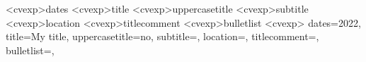 \newcommand{\datesstyle}[1]{
    \fontsize{\datefontsize}{0}\textnormal{#1}
}

\newcommand{\titlestyle}[1]{
    \fontsize{\datefontsize}{0}\textcolor{hltxt}{\textbf{#1}}
}

\newcommand{\subtitlestyle}[1]{
    \ifthenelse{\equal{#1}{}}
    {
        \vspace{-\baselineskip}
    }{\textcolor{subhltxt}{\textbf{#1}}}
}

\newcommand{\locationstyle}[1]{
    \ifthenelse{\equal{#1}{}}
    {}{\textnormal{#1}}
}

\newcommand{\titlecommentstyle}[1]{
    \ifthenelse{\equal{#1}{}}
    {
        \vspace{-\baselineskip}
    }{(#1)}
}

\newcommand{\bulletliststyle}[1]{
    \ifthenelse{\equal{#1}{}}{}{
        \vspace{\vspacebulletvalue}
        \readlist\mylist{#1}%
        \begin{itemize} 
            \foreachitem\z\in\mylist[]{
                \item \z
            }
        \end{itemize}
        \bulletpadding
    }
}



\DeclareOptionX<cvexp>{dates}{\def\dates{#1}}
\DeclareOptionX<cvexp>{title}{\def\title{#1}}
\DeclareOptionX<cvexp>{uppercasetitle}{\def\uppercasetitle{#1}}
\DeclareOptionX<cvexp>{subtitle}{\def\subtitle{#1}}
\DeclareOptionX<cvexp>{location}{\def\location{#1}}
\DeclareOptionX<cvexp>{titlecomment}{\def\titlecomment{#1}}
\DeclareOptionX<cvexp>{bulletlist}{\def\bulletlist{#1}}
\ExecuteOptionsX<cvexp>{
    dates=2022,
    title=My title,
    uppercasetitle=no,
    subtitle=,
    location=,
    titlecomment=,
    bulletlist={},
}


